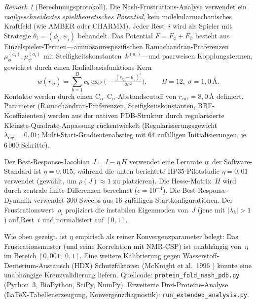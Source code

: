 \documentclass[12pt,a4paper]{article}
\theoremstyle{remark}
\newtheorem{remark}{Remark}
\begin{document}
\begin{remark}[Berechnungsprotokoll]\label{rem:comp-protocol}
Die Nash-Frustrations-Analyse verwendet ein \emph{ma\ss{}geschneidertes spieltheoretisches Potential}, kein molekularmechanisches Kraftfeld (wie AMBER oder CHARMM).
Jeder Rest~$i$ wird als Spieler mit Strategie $\theta_i = (\phi_i, \psi_i)$ behandelt.
Das Potential $F = F_\phi + F_\psi$ besteht aus Einzelspieler-Termen---aminos\"aurespezifischen Ramachandran-Pr\"aferenzen $\mu_\phi^{(a_i)}, \mu_\psi^{(a_i)}$ mit Steifigkeitskonstanten~$k^{(a_i)}$---und paarweisen Kopplungstermen, gewichtet durch einen Radialbasisfunktions-Kern
\[
  w(r_{ij}) = \sum_{b=1}^{B} c_b \exp\!\bigl(-\tfrac{(r_{ij}-\mu_b)^2}{2\sigma^2}\bigr),
  \qquad B=12,\; \sigma = 1{,}0\,\text{\AA}.
\]
Kontakte werden durch einen C$_\alpha$--C$_\alpha$-Abstandscutoff von $r_\text{cut} = 8{,}0$\,\AA{} definiert.
Parameter (Ramachandran-Pr\"aferenzen, Steifigkeitskonstanten, RBF-Koeffizienten) werden aus der nativen PDB-Struktur durch regularisierte Kleinste-Quadrate-Anpassung r\"uckentwickelt (Regularisierungsgewicht $\lambda_{\text{reg}} = 0{,}01$; Multi-Start-Gradientenabstieg mit 64 zuf\"alligen Initialisierungen, je 6\,000 Schritte).

Der Best-Response-Jacobian $J = I - \eta\, H$ verwendet eine Lernrate $\eta$; der Software-Standard ist $\eta = 0{,}015$, w\"ahrend die unten berichtete HP35-Pilotstudie $\eta = 0{,}01$ verwendet (gew\"ahlt, um $\rho(J) \approx 1$ zu platzieren). Die Hesse-Matrix~$H$ wird durch zentrale finite Differenzen berechnet ($\epsilon = 10^{-4}$).
Die Best-Response-Dynamik verwendet 300 Sweeps aus 16 zuf\"alligen Startkonfigurationen.
Der Frustrationswert~$\rho_i$ projiziert die instabilen Eigenmoden von~$J$ (jene mit $|\lambda_k| > 1$) auf Rest~$i$ und normalisiert auf $[0,1]$.

Wie oben gezeigt, ist $\eta$ empirisch als reiner Konvergenzparameter belegt: Das Frustrationsmuster (und seine Korrelation mit NMR-CSP) ist unabh\"angig von~$\eta$ im Bereich $[0{,}001;\; 0{,}1]$. Eine weitere Kalibrierung gegen Wasserstoff-Deuterium-Austausch (HDX) Schutzfaktoren (McKnight et al.\ 1996 \cite{McKnight1996}) k\"onnte eine unabh\"angige Kreuzvalidierung liefern.
Quellcode: \texttt{protein\_fold\_nash\_pdb.py} (Python~3, BioPython, SciPy, NumPy).
Erweiterte Drei-Proteine-Analyse (LaTeX-Tabellenerzeugung, Konvergenzdiagnostik): \texttt{run\_extended\_analysis.py}.
\end{remark}
\end{document}

